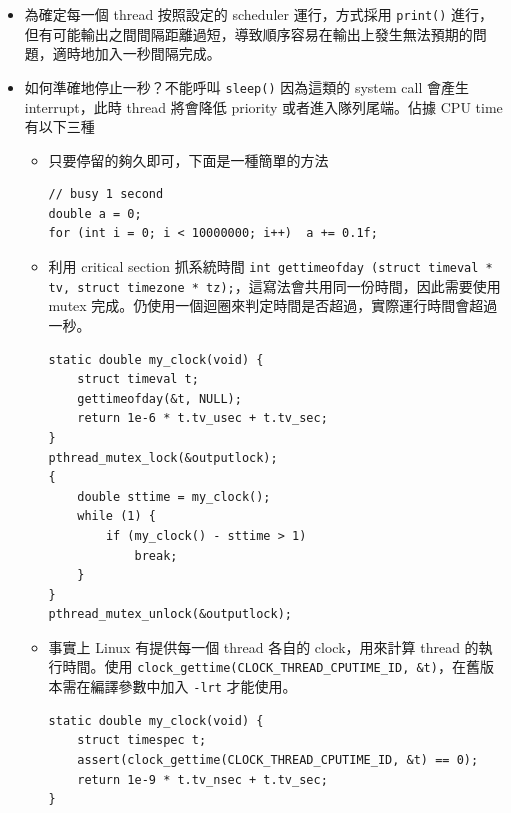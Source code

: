 \documentclass{res}
\begin{document}
\begin{resume}
\begin{itemize}
\end{itemize}

\hspace*{.1in} 

\begin{itemize}
	\item 為確定每一個 thread 按照設定的 scheduler 運行，方式採用 \lstinline{print()} 進行，但有可能輸出之間間隔距離過短，導致順序容易在輸出上發生無法預期的問題，適時地加入一秒間隔完成。
	
	\item 如何準確地停止一秒？不能呼叫 \lstinline{sleep()} 因為這類的 system call 會產生 interrupt，此時 thread 將會降低 priority 或者進入隊列尾端。佔據 CPU time 有以下三種
	\begin{itemize}
		\item 只要停留的夠久即可，下面是一種簡單的方法	
\begin{lstlisting}
// busy 1 second
double a = 0;
for (int i = 0; i < 10000000; i++)	a += 0.1f;
\end{lstlisting}
		\item 利用 critical section 抓系統時間 \lstinline{int gettimeofday (struct timeval * tv, struct timezone * tz);}，這寫法會共用同一份時間，因此需要使用 mutex 完成。仍使用一個迴圈來判定時間是否超過，實際運行時間會超過一秒。
\begin{lstlisting}[frame=single]
static double my_clock(void) {
	struct timeval t;
	gettimeofday(&t, NULL);
	return 1e-6 * t.tv_usec + t.tv_sec;
}
pthread_mutex_lock(&outputlock);
{
	double sttime = my_clock();
	while (1) {
		if (my_clock() - sttime > 1)
			break;
	}
}
pthread_mutex_unlock(&outputlock);
\end{lstlisting}

		\item 事實上 Linux 有提供每一個 thread 各自的 clock，用來計算 thread 的執行時間。使用 \lstinline{clock_gettime(CLOCK_THREAD_CPUTIME_ID, &t)}，在舊版本需在編譯參數中加入 \lstinline{-lrt} 才能使用。
\begin{lstlisting}[frame=single]
static double my_clock(void) {
	struct timespec t;
	assert(clock_gettime(CLOCK_THREAD_CPUTIME_ID, &t) == 0);
	return 1e-9 * t.tv_nsec + t.tv_sec;
}
\end{lstlisting}

	\end{itemize}
\end{itemize}

\vspace*{.1in} 


\end{resume}
\end{document}
